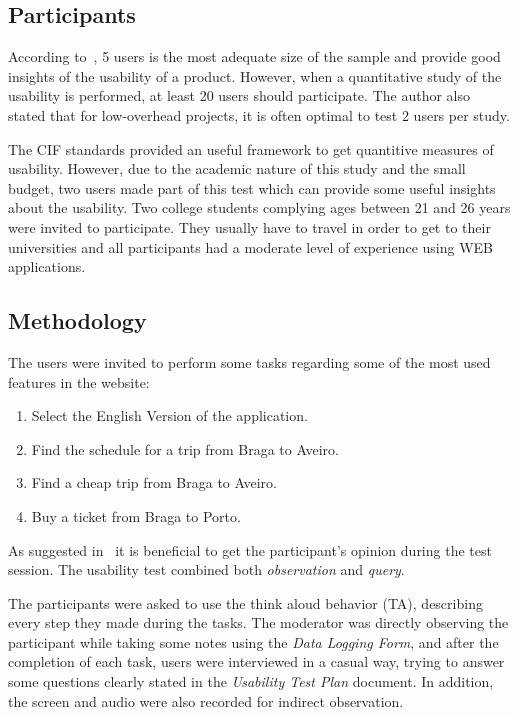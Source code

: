 \documentclass[a4paper]{article}
\begin{document}
\subsection{Participants} According to~\citet{nielsen2012many}, 5 users is the most adequate size of the sample and provide good insights of the usability of a product. However, when a quantitative study of the usability is performed, at least 20 users should participate. The author also stated that for low-overhead projects, it is often optimal to test 2 users per study.

The CIF standards provided an useful framework to get quantitive measures of usability. However, due to the academic nature of this study and the small budget, two users made part of this test which can provide some useful insights about the usability. Two college students complying ages between 21 and 26 years were invited to participate. They usually have to travel in order to get to their universities and all participants had a moderate level of experience using WEB applications. 


\begin{samepage}
\subsection{Methodology} The users were invited to perform some tasks regarding some of the most used features in the website:

\begin{enumerate}
  \item Select the English Version of the application.
  \item Find the schedule for a trip from Braga to Aveiro.
  \item Find a cheap trip from Braga to Aveiro.
  \item Buy a ticket from Braga to Porto.
\end{enumerate}
\end{samepage}

As suggested in~\citep{mitchell2007step} it is beneficial to get the participant's opinion during the test session.
The usability test combined both \emph{observation} and \textit{query}.

The participants were asked to use the think aloud behavior (TA), describing every step they made during the tasks.
The moderator was directly observing the participant while taking some notes using the \emph{Data Logging Form}, and after the completion of each task, users were interviewed in a casual way, trying to answer some questions clearly stated in the \emph{Usability Test Plan} document.
In addition, the screen and audio were also recorded for indirect observation.
 
\end{document}
